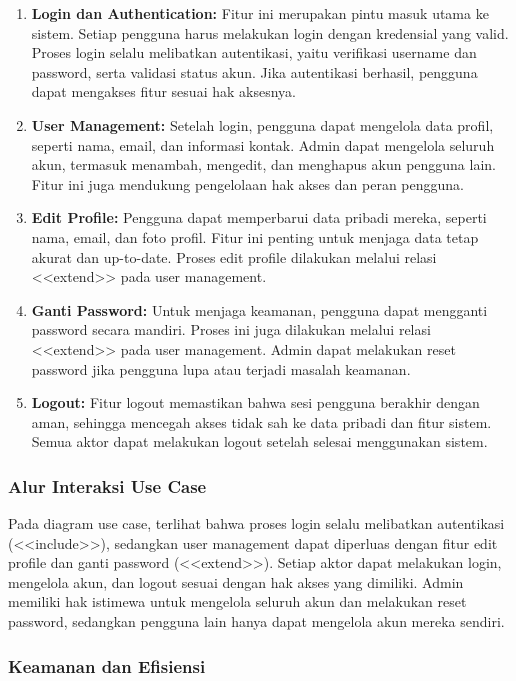 \documentclass[a4paper,oneside,11pt]{book}
\begin{document}
\begin{enumerate}
  \item \textbf{Login dan Authentication:} Fitur ini merupakan pintu masuk utama ke sistem. Setiap pengguna harus melakukan login dengan kredensial yang valid. Proses login selalu melibatkan autentikasi, yaitu verifikasi username dan password, serta validasi status akun. Jika autentikasi berhasil, pengguna dapat mengakses fitur sesuai hak aksesnya.
  \item \textbf{User Management:} Setelah login, pengguna dapat mengelola data profil, seperti nama, email, dan informasi kontak. Admin dapat mengelola seluruh akun, termasuk menambah, mengedit, dan menghapus akun pengguna lain. Fitur ini juga mendukung pengelolaan hak akses dan peran pengguna.
  \item \textbf{Edit Profile:} Pengguna dapat memperbarui data pribadi mereka, seperti nama, email, dan foto profil. Fitur ini penting untuk menjaga data tetap akurat dan up-to-date. Proses edit profile dilakukan melalui relasi <<extend>> pada user management.
  \item \textbf{Ganti Password:} Untuk menjaga keamanan, pengguna dapat mengganti password secara mandiri. Proses ini juga dilakukan melalui relasi <<extend>> pada user management. Admin dapat melakukan reset password jika pengguna lupa atau terjadi masalah keamanan.
  \item \textbf{Logout:} Fitur logout memastikan bahwa sesi pengguna berakhir dengan aman, sehingga mencegah akses tidak sah ke data pribadi dan fitur sistem. Semua aktor dapat melakukan logout setelah selesai menggunakan sistem.
\end{enumerate}

\subsubsection{Alur Interaksi Use Case}

Pada diagram use case, terlihat bahwa proses login selalu melibatkan autentikasi (<<include>>), sedangkan user management dapat diperluas dengan fitur edit profile dan ganti password (<<extend>>). Setiap aktor dapat melakukan login, mengelola akun, dan logout sesuai dengan hak akses yang dimiliki. Admin memiliki hak istimewa untuk mengelola seluruh akun dan melakukan reset password, sedangkan pengguna lain hanya dapat mengelola akun mereka sendiri.

\subsubsection{Keamanan dan Efisiensi}
\end{document}
